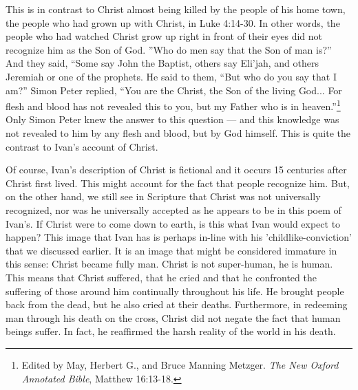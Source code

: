 	This is in contrast to Christ almost being killed by the people of his home town, the people who had grown up with Christ, in Luke 4:14-30. In other words, the people who had watched Christ grow up right in front of their eyes did not recognize him as the Son of God. ''Who do men say that the Son of man is?'' And they said, ``Some say John the Baptist, others say Eli'jah, and others Jeremiah or one of the prophets. He said to them, ``But who do you say that I am?'' Simon Peter replied, ``You are the Christ, the Son of the living God... For flesh and blood has not revealed this to you, but my Father who is in heaven.''\footnote{Edited by May, Herbert G., and Bruce Manning Metzger. \emph{The New Oxford Annotated Bible}, Matthew 16:13-18.} Only Simon Peter knew the answer to this question --- and this knowledge was not revealed to him by any flesh and blood, but by God himself. This is quite the contrast to Ivan's account of Christ.

	Of course, Ivan's description of Christ is fictional and it occurs 15 centuries after Christ first lived. This might account for the fact that people recognize him. But, on the other hand, we still see in Scripture that Christ was not universally recognized, nor was he universally accepted as he appears to be in this poem of Ivan's. If Christ were to come down to earth, is this what Ivan would expect to happen? This image that Ivan has is perhaps in-line with his 'childlike-conviction' that we discussed earlier. It is an image that might be considered immature in this sense: Christ became fully man. Christ is not super-human, he is human. This means that Christ suffered, that he cried and that he confronted the suffering of those around him continually throughout his life. He brought people back from the dead, but he also cried at their deaths. Furthermore, in redeeming man through his death on the cross, Christ did not negate the fact that human beings suffer. In fact, he reaffirmed the harsh reality of the world in his death.

